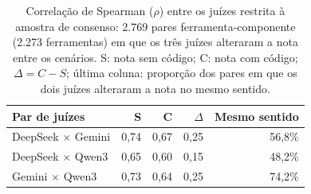 \begin{table}[H]
\centering
\caption{Correlação de Spearman ($\rho$) entre os juízes restrita à amostra de consenso: 2.769 pares ferramenta-componente (2.273 ferramentas) em que os três juízes alteraram a nota entre os cenários. S: nota sem código; C: nota com código; $\Delta = C - S$; última coluna: proporção dos pares em que os dois juízes alteraram a nota no mesmo sentido.}
\label{tab:correlacao-juizes-consenso}
\begin{tabular}{lrrrr}
\toprule
\textbf{Par de juízes} & \textbf{S} & \textbf{C} & \textbf{$\Delta$} & \textbf{Mesmo sentido} \\
\midrule
DeepSeek $\times$ Gemini & 0,74 & 0,67 & 0,25 & 56,8\% \\
DeepSeek $\times$ Qwen3 & 0,65 & 0,60 & 0,15 & 48,2\% \\
Gemini $\times$ Qwen3 & 0,73 & 0,64 & 0,25 & 74,2\% \\
\bottomrule
\end{tabular}
\end{table}
